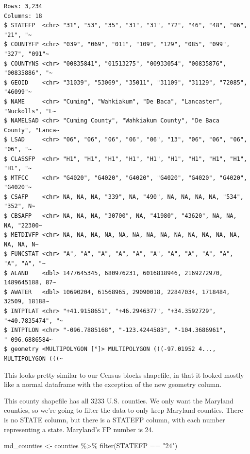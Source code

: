 \documentclass[
  letterpaper,
  DIV=11,
  numbers=noendperiod]{scrreprt}
\newenvironment{Shaded}{\begin{snugshade}}{\end{snugshade}}
\newcommand{\FunctionTok}[1]{\textcolor[rgb]{0.28,0.35,0.67}{#1}}
\newcommand{\NormalTok}[1]{\textcolor[rgb]{0.00,0.23,0.31}{#1}}
\newcommand{\OtherTok}[1]{\textcolor[rgb]{0.00,0.23,0.31}{#1}}
\newcommand{\SpecialCharTok}[1]{\textcolor[rgb]{0.37,0.37,0.37}{#1}}
\newcommand{\StringTok}[1]{\textcolor[rgb]{0.13,0.47,0.30}{#1}}
\begin{document}
\begin{verbatim}
Rows: 3,234
Columns: 18
$ STATEFP  <chr> "31", "53", "35", "31", "31", "72", "46", "48", "06", "21", "~
$ COUNTYFP <chr> "039", "069", "011", "109", "129", "085", "099", "327", "091"~
$ COUNTYNS <chr> "00835841", "01513275", "00933054", "00835876", "00835886", "~
$ GEOID    <chr> "31039", "53069", "35011", "31109", "31129", "72085", "46099"~
$ NAME     <chr> "Cuming", "Wahkiakum", "De Baca", "Lancaster", "Nuckolls", "L~
$ NAMELSAD <chr> "Cuming County", "Wahkiakum County", "De Baca County", "Lanca~
$ LSAD     <chr> "06", "06", "06", "06", "06", "13", "06", "06", "06", "06", "~
$ CLASSFP  <chr> "H1", "H1", "H1", "H1", "H1", "H1", "H1", "H1", "H1", "H1", "~
$ MTFCC    <chr> "G4020", "G4020", "G4020", "G4020", "G4020", "G4020", "G4020"~
$ CSAFP    <chr> NA, NA, NA, "339", NA, "490", NA, NA, NA, NA, "534", "352", N~
$ CBSAFP   <chr> NA, NA, NA, "30700", NA, "41980", "43620", NA, NA, NA, "22300~
$ METDIVFP <chr> NA, NA, NA, NA, NA, NA, NA, NA, NA, NA, NA, NA, NA, NA, NA, N~
$ FUNCSTAT <chr> "A", "A", "A", "A", "A", "A", "A", "A", "A", "A", "A", "A", "~
$ ALAND    <dbl> 1477645345, 680976231, 6016818946, 2169272970, 1489645188, 87~
$ AWATER   <dbl> 10690204, 61568965, 29090018, 22847034, 1718484, 32509, 18188~
$ INTPTLAT <chr> "+41.9158651", "+46.2946377", "+34.3592729", "+40.7835474", "~
$ INTPTLON <chr> "-096.7885168", "-123.4244583", "-104.3686961", "-096.6886584~
$ geometry <MULTIPOLYGON [°]> MULTIPOLYGON (((-97.01952 4..., MULTIPOLYGON (((~
\end{verbatim}

This looks pretty similar to our Census blocks shapefile, in that it
looked mostly like a normal dataframe with the exception of the new
geometry column.

This county shapefile has all 3233 U.S. counties. We only want the
Maryland counties, so we're going to filter the data to only keep
Maryland counties. There is no STATE column, but there is a STATEFP
column, with each number representing a state. Maryland's FP number is
24.

\begin{Shaded}
\begin{Highlighting}[]
\NormalTok{md\_counties }\OtherTok{\textless{}{-}}\NormalTok{ counties }\SpecialCharTok{\%\textgreater{}\%}
  \FunctionTok{filter}\NormalTok{(STATEFP }\SpecialCharTok{==} \StringTok{"24"}\NormalTok{)}
\end{Highlighting}
\end{Shaded}
\end{document}
